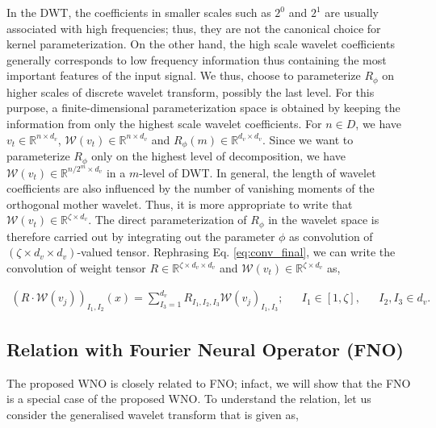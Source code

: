 \documentclass{article}
\begin{document}
In the DWT, the coefficients in smaller scales such as $2^0$ and $2^1$ are usually associated with high frequencies; thus, they are not the canonical choice for kernel parameterization. On the other hand, the high scale wavelet coefficients generally corresponds to low frequency information thus containing the most important features of the input signal. We thus, choose to parameterize $R_{\phi}$ on higher scales of discrete wavelet transform, possibly the last level. For this purpose, a finite-dimensional parameterization space is obtained by keeping the information from only the highest scale wavelet coefficients. For $n \in D$, we have $v_{t} \in \mathbb{R}^{n \times d_{v}}$, $\mathcal{W}\left(v_{t}\right) \in \mathbb{R}^{n \times d_{v}}$ and $R_{\phi}(m) \in \mathbb{R}^{d_{v} \times d_{v}}$. Since we want to parameterize $R_{\phi}$ only on the highest level of decomposition, we have $\mathcal{W}\left(v_{t}\right) \in \mathbb{R}^{n/2^m \times d_{v}}$ in a $m$-level of DWT. In general, the length of wavelet coefficients are also influenced by the number of vanishing moments of the orthogonal mother wavelet. Thus, it is more appropriate to write that $\mathcal{W}\left(v_{t}\right) \in \mathbb{R}^{\zeta \times d_{v}}$. The direct parameterization of $R_{\phi}$ in the wavelet space is therefore carried out by integrating out the parameter $\phi$ as convolution of $\left(\zeta \times d_{v} \times d_{v} \right)$-valued tensor. Rephrasing Eq. \eqref{eq:conv_final}, we can write the convolution of weight tensor $R \in \mathbb{R}^{\zeta \times d_{v} \times d_{v}}$ and $\mathcal{W}\left(v_{t}\right) \in \mathbb{R}^{\zeta \times d_{v}}$ as,

\begin{equation}
    \begin{aligned}
        \left(R \cdot \mathcal{W} (v_{j})\right)_{I_1, I_2} (x) = \sum_{I_{3}=1}^{d_{v}} R_{I_1, I_2, I_3} \mathcal{W} (v_{j})_{I_1, I_3}; && I_1 \in [1, \zeta], && I_{2}, I_{3} \in d_{v}.
    \end{aligned}
\end{equation}


\subsection*{Relation with Fourier Neural Operator (FNO)}
The proposed WNO is closely related to FNO; infact, we will show that the FNO is a special case of the proposed WNO. To understand the relation, let us consider the generalised wavelet transform that is given as,
\end{document}

